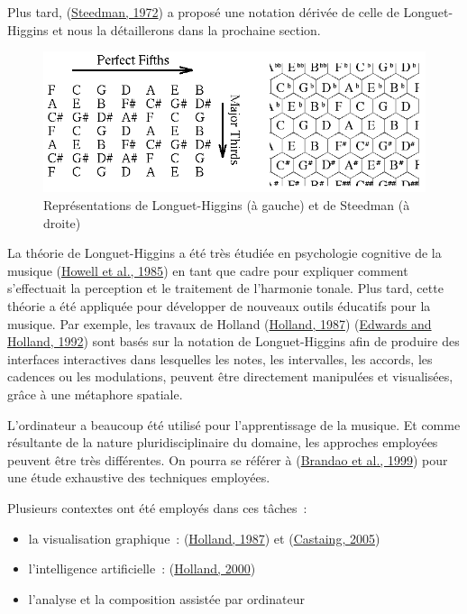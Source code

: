 \documentclass[
]{book}
\providecommand{\tightlist}{%
  \setlength{\itemsep}{0pt}\setlength{\parskip}{0pt}}
\begin{document}
Plus tard, (\protect\hyperlink{ref-steedman1972formal}{Steedman, 1972}) a proposé une notation dérivée de celle de
Longuet-Higgins et nous la détaillerons dans la prochaine section.

\begin{figure}
\centering
\includegraphics{img/higinsSteedman.png}
\caption{\label{fig:Longuet-Higgins}Représentations de Longuet-Higgins (à gauche)
et de Steedman (à droite)}
\end{figure}

La théorie de Longuet-Higgins a été très étudiée en psychologie cognitive de
la musique (\protect\hyperlink{ref-howell1985musical}{Howell et al., 1985}) en
tant que cadre pour expliquer comment s'effectuait la perception et le
traitement de l'harmonie tonale. Plus tard, cette théorie a été appliquée
pour développer de nouveaux outils éducatifs pour la musique. Par exemple,
les travaux de Holland (\protect\hyperlink{ref-holland1987direct}{Holland, 1987}) (\protect\hyperlink{ref-edwards1992multimedia}{Edwards and Holland, 1992}) sont basés sur
la notation de Longuet-Higgins afin de produire des interfaces interactives
dans lesquelles les notes, les intervalles, les accords, les cadences ou les
modulations, peuvent être directement manipulées et visualisées, grâce à une
métaphore spatiale.

L'ordinateur a beaucoup été utilisé pour l'apprentissage de la musique. Et
comme résultante de la nature pluridisciplinaire du domaine, les approches
employées peuvent être très différentes. On pourra se référer à
(\protect\hyperlink{ref-brandao1999computers}{Brandao et al., 1999}) pour une étude exhaustive des techniques employées.

Plusieurs contextes ont été employés dans ces tâches~:

\begin{itemize}
\tightlist
\item
  la visualisation graphique~: (\protect\hyperlink{ref-holland1987direct}{Holland, 1987}) et (\protect\hyperlink{ref-Castaing2004}{Castaing, 2005})
\item
  l'intelligence artificielle~: (\protect\hyperlink{ref-holland2000artificial}{Holland, 2000})
\item
  l'analyse et la composition assistée par
  ordinateur
\end{itemize}
\end{document}
